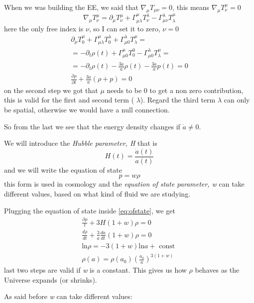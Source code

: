 When we was building the EE, we said that $\nabla _{\mu }T_{\mu \nu } = 0$, this means $\nabla _{\mu }T^{\mu }_{\nu } = 0$
\[
\nabla _{\mu }T_{\nu }^{\mu } = \partial_{\mu }T^{\mu }_{\nu } + \Gamma ^{\mu }_{\mu \lambda }T^{\lambda }_{\nu } - \Gamma ^{\lambda }_{\mu \nu }T^{\mu }_{\lambda }
\]
here the only free index is $\nu $, so I can set it to zero, $\nu  = 0$	
\begin{gather}
\partial_{\mu }T^{\mu }_{0} + \Gamma ^{\mu }_{\mu \lambda }T^{\lambda }_{0} + \Gamma ^{\lambda }_{\mu  0}T^{\mu }_{\lambda } =  \nonumber\\
 = -\partial_{t}\rho \left( t \right) + \Gamma ^{\mu }_{\mu 0} T^{0}_{0} - \Gamma ^{\lambda }_{\mu 0}T^{\mu }_{\lambda } = \nonumber\\
 = -\partial_{t}\rho \left( t \right) - \frac{3 \dot{a}}{a}\rho \left( t \right) - \frac{3 \dot{a}}{a}p\left( t \right) = 0 \nonumber\\
 \frac{\partial \rho }{\partial t} + \frac{3 \dot{a}}{a}\left( \rho +p \right) = 0 \label{eq:ofstate}
\end{gather}
on the second step we got that $\mu $ needs to be 0 to get a non zero contribution, this is valid for the first and second term ( $\lambda $). Regard the third term $\lambda $ can only be spatial, otherwise we would have a null connection.\par
So from the last we see that the energy density  changes if $\dot{a}\neq0$.\par
We will introduce the \emph{Hubble parameter, H} that is 
\[
H\left( t \right) = \frac{\dot{a}\left( t \right)}{a\left( t \right)}
\]
and we will write the equation of state 
\[
p = w\rho 
\]
this form is used in cosmology and the \emph{equation of state parameter, w} can take different values, based on what kind of fluid we are studying.\par
Plugging the equation of state inside \ref{eq:ofstate}, we get
\begin{gather}
\frac{\partial \rho }{ t}  + 3H\left( 1+w \right) \rho  = 0 \nonumber\\
\frac{d \rho }{d t} + \frac{3}{a} \frac{d a}{d t} \left( 1+w \right)\rho  = 0 \nonumber\\
\text{ln}\rho = -3\left( 1+w \right)\text{ln}a + \text{ const } \nonumber\\
\rho \left( a \right) = \rho \left( a_{0} \right)\left( \frac{a_{0}}{a} \right)^{3\left( 1+w \right)} \label{eq:densitime}
\end{gather}
last two steps are valid if \emph{w} is a constant. This gives us how $\rho $ behaves as the Universe expands (or shrinks).\par
As said before \emph{w} can take different values:
